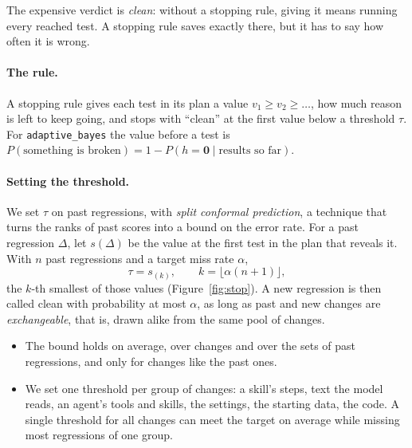 \documentclass[11pt,a4paper]{article}
\newcommand{\strat}[1]{\texttt{#1}}
\begin{document}
The expensive verdict is \emph{clean}: without a stopping rule, giving it means running every reached test. A
stopping rule saves exactly there, but it has to say how often it is wrong.

\paragraph{The rule.} A stopping rule gives each test in its plan a value $v_1 \ge v_2 \ge \dots$, how much reason
is left to keep going, and stops with ``clean'' at the first value below a threshold $\tau$. For
\strat{adaptive\_bayes} the value before a test is $P(\text{something is broken}) = 1 - P(h = \mathbf{0} \mid
\text{results so far})$.

\paragraph{Setting the threshold.} We set $\tau$ on past regressions, with \emph{split conformal prediction}, a
technique that turns the ranks of past scores into a bound on the error rate. For a past regression $\Delta$, let
$s(\Delta)$ be the value at the first test in the plan that reveals it. With $n$ past regressions and a target miss
rate $\alpha$,
\[
  \tau = s_{(k)}, \qquad k = \lfloor \alpha (n + 1) \rfloor ,
\]
the $k$-th smallest of those values (Figure~\ref{fig:stop}). A new regression is then called clean with
probability at most $\alpha$, as long as past and new changes are \emph{exchangeable}, that is, drawn alike from
the same pool of changes.
\begin{itemize}
  \item The bound holds on average, over changes and over the sets of past regressions, and only for changes like
        the past ones.
  \item We set one threshold per group of changes: a skill's steps, text the model reads, an agent's tools and
        skills, the settings, the starting data, the code. A single threshold for all changes can meet the target
        on average while missing most regressions of one group.
\end{itemize}
\end{document}
